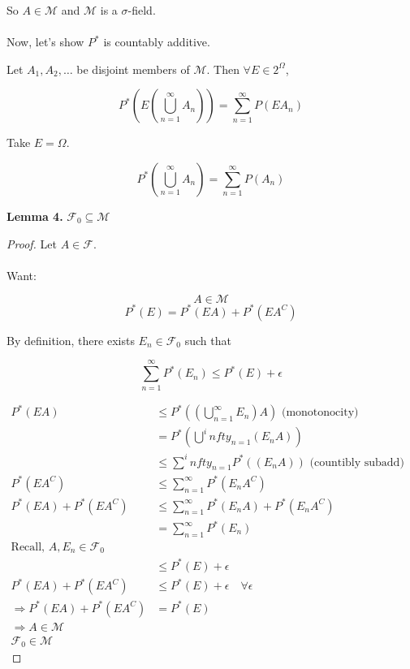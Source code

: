 \documentclass[11pt,fleqn]{book} %
\begin{document}
So $A \in \mathcal{M}$ and $\mathcal{M}$ is a $\sigma$-field. \\
\\

Now, let's show $P^*$ is countably additive.

Let $A_1, A_2, \dots$ be disjoint members of $\mathcal{M}$. Then $\forall E \in 2^\Omega$, 

$$P^*(E(\bigcup^\infty_{n=1} A_n)) = \displaystyle \sum^\infty_{n=1} P(E A_n) $$

Take $E = \Omega$. 

$$P^*(\bigcup^\infty_{n=1} A_n) = \displaystyle \sum^\infty_{n=1} P( A_n) $$


\textbf{Lemma 4.} $\mathcal{F}_0 \subseteq \mathcal{M}$

\begin{proof}
	Let $A \in \mathcal{F}$.\\
	\\

	Want:

	$$A \in \mathcal{M} $$
$$P^*(E) = P^*(EA) + P^*(E A^C) $$

By definition, there exists $E_n \in \mathcal{F}_0$ 
such that 

$$\displaystyle \sum^\infty_{n=1} P^*(E_n) \leq P^*(E) + \epsilon $$

$\begin{aligned}
	P^*(EA) &\leq P^*((\bigcup^\infty_{n=1} E_n)A) \text{ (monotonocity)}\\
		&= P^* (\bigcup^infty_{n=1} (E_n A))\\
		&\leq \displaystyle \sum^infty_{n=1}P^* ( (E_n A)) \text{ (countibly subadd)}\\
	P^*(E A^C) &\leq \displaystyle \sum^\infty_{n=1} P^*(E_n A^C)\\
	P^*(EA) + P^*(E A^C) &\leq 	\displaystyle \sum^\infty_{n=1} P^*(E_n A) + P^*(E_n A^C)\\
		&= \displaystyle \sum^\infty_{n=1} P^*(E_n)\\
	\text{Recall, } A, E_n \in \mathcal{F}_0\\
		&\leq P^*(E) + \epsilon\\
	P^*(EA) + P^*(E A^C) & \leq P^*(E) + \epsilon \quad \forall \epsilon\\
	\Rightarrow P^*(EA) + P^*(EA^C) &= P^*(E)\\
	\Rightarrow A \in \mathcal{M}\\
	\mathcal{F}_0 \in \mathcal{M}
\end{aligned}$
 
\end{proof}
\end{document}
